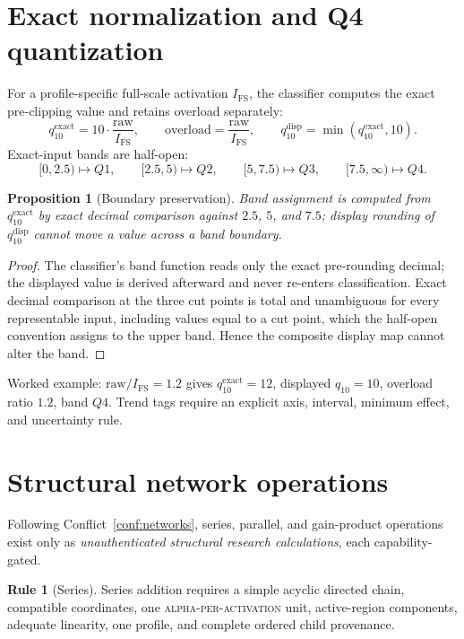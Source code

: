 \documentclass[11pt]{amsart}
\newtheorem{proposition}[theorem]{Proposition}
\theoremstyle{definition}
\newtheorem{ruleenv}[theorem]{Rule}
\theoremstyle{remark}
\begin{document}
\section{Exact normalization and Q4 quantization}\label{sec:q4}

For a profile-specific full-scale activation $I_{\mathrm{FS}}$, the classifier computes the exact pre-clipping value and retains overload separately:
\[
q_{10}^{\mathrm{exact}}=10\cdot\frac{\mathrm{raw}}{I_{\mathrm{FS}}},\qquad
\mathrm{overload}=\frac{\mathrm{raw}}{I_{\mathrm{FS}}},\qquad
q_{10}^{\mathrm{disp}}=\min(q_{10}^{\mathrm{exact}},10).
\]
Exact-input bands are half-open:
\[
[0,2.5)\mapsto Q1,\qquad [2.5,5)\mapsto Q2,\qquad [5,7.5)\mapsto Q3,\qquad [7.5,\infty)\mapsto Q4 .
\]

\begin{proposition}[Boundary preservation]\label{prop:boundary}
Band assignment is computed from $q_{10}^{\mathrm{exact}}$ by exact decimal comparison against $2.5$, $5$, and $7.5$; display rounding of $q_{10}^{\mathrm{disp}}$ cannot move a value across a band boundary.
\end{proposition}

\begin{proof}
The classifier's band function reads only the exact pre-rounding decimal; the displayed value is derived afterward and never re-enters classification. Exact decimal comparison at the three cut points is total and unambiguous for every representable input, including values equal to a cut point, which the half-open convention assigns to the upper band. Hence the composite display map cannot alter the band.
\end{proof}

Worked example: $\mathrm{raw}/I_{\mathrm{FS}}=1.2$ gives $q_{10}^{\mathrm{exact}}=12$, displayed $q_{10}=10$, overload ratio $1.2$, band $Q4$. Trend tags require an explicit axis, interval, minimum effect, and uncertainty rule.

\section{Structural network operations}\label{sec:netops}

Following Conflict~\ref{conf:networks}, series, parallel, and gain-product operations exist only as \emph{unauthenticated structural research calculations}, each capability-gated.

\begin{ruleenv}[Series]\label{rule:series}
Series addition requires a simple acyclic directed chain, compatible coordinates, one \textsc{alpha-per-activation} unit, active-region components, adequate linearity, one profile, and complete ordered child provenance.
\end{ruleenv}
\end{document}
